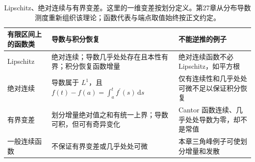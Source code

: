 \begin{table}[htbp]
\centering\small\renewcommand{\arraystretch}{1.18}\setlength{\tabcolsep}{4pt}
\caption[Lipschitz、绝对连续与有界变差]{Lipschitz、绝对连续与有界变差。这里的一维变差按划分定义。第27章从分布导数测度重新组织该理论；函数代表与端点取值始终按正文约定。}
\label{b1:tab:visual-t09}
\begin{tabularx}{\linewidth}{@{}>{\raggedright\arraybackslash}p{3.1cm}>{\raggedright\arraybackslash}p{4.7cm}>{\raggedright\arraybackslash}X@{}}
\toprule
有限区间上的函数类 & 导数与积分恢复 & 不能逆推的例子 \\
\midrule
Lipschitz & 绝对连续；导数几乎处处存在且本性有界；积分恢复函数增量 & 绝对连续函数不必 Lipschitz，如平方根 \\
绝对连续 & 导数属于 \(L^1\)，且 \(f(t)-f(a)=\int_a^t f^{\prime}(s)\,\mathrm{d}s\) & 仅有连续性和几乎处处可微不足以保证积分恢复 \\
有界变差 & 划分增量绝对值之和有统一上界；导数可积，但可有奇异变化 & Cantor 函数连续、几乎处处导数为零，却不是常值 \\
一般连续函数 & 不保证有界变差或几乎处处可微 & 本章三角峰例子可使划分增量和发散 \\
\bottomrule
\end{tabularx}
\end{table}
